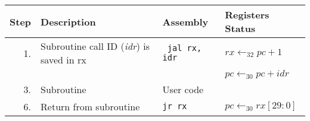 \begin{center}
\begin{tabular}{|r|l|l|l|}
\hline
\textbf{Step} & \textbf{Description} & \textbf{Assembly} & \textbf{Registers Status}\\
\hline
\hline
1. & Subroutine call ID (\emph{idr}) is saved in rx & \texttt{ jal rx, idr}            & \hspace{20pt}$rx \leftarrow_{32} pc+1$ \\
   &                                                &                                  & \hspace{20pt}$pc \leftarrow_{30} pc + idr$ \\
\hline
3. & Subroutine                                     & User code                        & \\
\hline
6. & Return from subroutine                         & \texttt{jr rx}                   & $pc \leftarrow_{30} rx[29:0]$ \\
\hline
\end{tabular}
\end{center}














